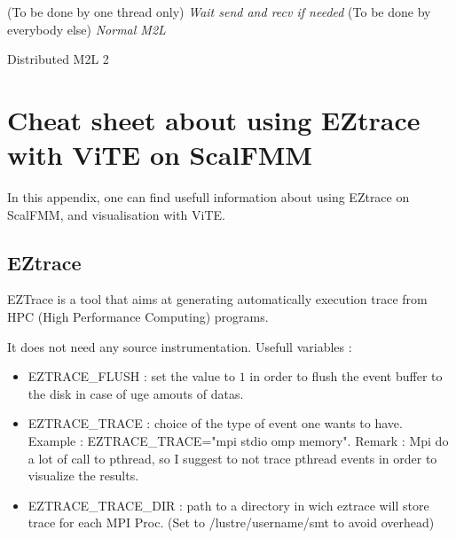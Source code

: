 \documentclass[12pt,letterpaper,titlepage]{report}
\begin{document}
\begin{algorithm}[H]
  \LinesNumbered
  \SetAlgoLined
  \BlankLine
  \Begin(To be done by one thread only){ \label{single}
      \emph{Wait send and recv if needed}\;
    }
    \Begin(To be done by everybody else){\label{multiple}
        \emph{Normal M2L}\;
      }
      \BlankLine
      \caption{Distributed M2L 2}
      
\end{algorithm}


\appendix

\clearpage
\chapter{Cheat sheet about using EZtrace with ViTE on ScalFMM}

In this appendix, one can find usefull information about using EZtrace
on ScalFMM, and visualisation with ViTE.

\section{EZtrace}
EZTrace is a tool that aims at generating automatically execution
trace from HPC (High Performance Computing) programs.

It does not need any source instrumentation.
Usefull variables :

\begin{itemize}
\item EZTRACE\_FLUSH : set the value to $1$ in order to flush the
  event buffer to the disk in case of uge amouts of datas.  
\item EZTRACE\_TRACE : choice of the type of event one wants to
  have. Example : EZTRACE\_TRACE="mpi stdio omp memory". Remark : Mpi do a
  lot of call to pthread, so I suggest to not trace pthread events in
  order to visualize the results.
\item EZTRACE\_TRACE\_DIR : path to a directory in wich eztrace will
  store trace for each MPI Proc. (Set to /lustre/username/smt to avoid
  overhead)
\end{itemize}
\end{document}
